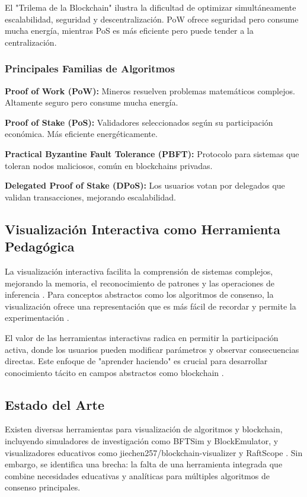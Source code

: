 \documentclass[spanish,12pt,letterpaper]{report}
\begin{document}
El "Trilema de la Blockchain" ilustra la dificultad de optimizar simultáneamente escalabilidad, seguridad y descentralización. PoW ofrece seguridad pero consume mucha energía, mientras PoS es más eficiente pero puede tender a la centralización.

\subsubsection{Principales Familias de Algoritmos}
\textbf{Proof of Work (PoW):} Mineros resuelven problemas matemáticos complejos. Altamente seguro pero consume mucha energía.

\textbf{Proof of Stake (PoS):} Validadores seleccionados según su participación económica. Más eficiente energéticamente.

\textbf{Practical Byzantine Fault Tolerance (PBFT):} Protocolo para sistemas que toleran nodos maliciosos, común en blockchains privadas.

\textbf{Delegated Proof of Stake (DPoS):} Los usuarios votan por delegados que validan transacciones, mejorando escalabilidad.

\subsection{Visualización Interactiva como Herramienta Pedagógica}
La visualización interactiva facilita la comprensión de sistemas complejos, mejorando la memoria, el reconocimiento de patrones y las operaciones de inferencia \parencite{researchgate2018towards}. Para conceptos abstractos como los algoritmos de consenso, la visualización ofrece una representación que es más fácil de recordar y permite la experimentación \parencite{stanford2025rodger}.

El valor de las herramientas interactivas radica en permitir la participación activa, donde los usuarios pueden modificar parámetros y observar consecuencias directas. Este enfoque de "aprender haciendo" es crucial para desarrollar conocimiento tácito en campos abstractos como blockchain \parencite{chronicle2025impact}.

\subsection{Estado del Arte}
Existen diversas herramientas para visualización de algoritmos y blockchain, incluyendo simuladores de investigación como BFTSim y BlockEmulator, y visualizadores educativos como jiechen257/blockchain-visualizer y RaftScope \parencite{github2025jiechen257, raftgithub2025raft}. Sin embargo, se identifica una brecha: la falta de una herramienta integrada que combine necesidades educativas y analíticas para múltiples algoritmos de consenso principales.
\end{document}
